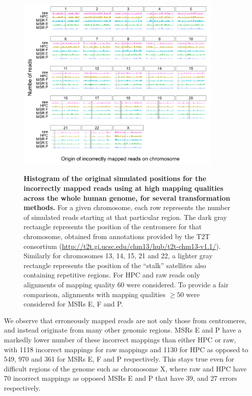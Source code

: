 \documentclass[
  11pt,
  twoside]{scrbook}
\newcommand{\extcaption}[2]{
    \caption[#1]{
        \textbf{#1}\newline
        #2
    }
}
\begin{document}
\begin{figure}[H]
    \centering
    \includegraphics[width=0.9\textwidth]{figures/HPC-MSRs/ridgelines.new_selection.pdf}\\
    \extcaption{Histogram of the original simulated positions for the incorrectly mapped reads using \minimap at high mapping qualities across the whole human genome, for several transformation methods.}{For a given chromosome, each row represents the number of simulated reads starting at that particular region. The dark gray rectangle represents the position of the centromere for that chromosome, obtained from annotations provided by the T2T consortium (\href{http://t2t.gi.ucsc.edu/chm13/hub/t2t-chm13-v1.1/}{http://t2t.gi.ucsc.edu/chm13/hub/t2t-chm13-v1.1/}). Similarly for chromosomes 13, 14, 15, 21 and 22, a lighter gray rectangle represents the position of the ``stalk'' satellites also containing repetitive regions. For HPC and raw reads only alignments of mapping quality 60 were considered. To provide a fair comparison, alignments with mapping qualities $\geq 50$ were considered for MSRs E, F and P.}
    \label{fig:errorHists}
\end{figure}

We observe that erroneously mapped reads are not only those from centromeres, and instead originate from many other genomic regions. MSRs E and P have a markedly lower number of these incorrect mappings than either HPC or raw, with 1118 incorrect mappings for raw mappings and 1130 for HPC as opposed to 549, 970 and 361 for MSRs E, F and P respectively. This stays true even for difficult regions of the genome such as chromosome X, where raw and HPC have 70 incorrect mappings as opposed MSRs E and P that have 39, and 27 errors respectively.
\end{document}
